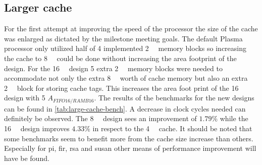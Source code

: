 \documentclass[final]{article}
\begin{document}
\subsection{Larger cache}
For the first attempt at improving the speed of the processor the size of the cache was enlarged as dictated by the milestone meeting goals.
The default Plasma processor only utilized half of 4 implemented \SI{2}{\kibi\byte} memory blocks so increasing the cache to \SI{8}{\kibi\byte} could be done without increasing the area footprint of the design.
For the \SI{16}{\kibi\byte} design 5 extra \SI{2}{\kibi\byte} memory blocks were needed to accommodate not only the extra \SI{8}{\kibi\byte} worth of cache memory but also an extra \SI{2}{\kibi\byte} block for storing cache tags.
This increases the area foot print of the \SI{16}{\kibi\byte} design with 5 $A_{FIFO16/RAMB16}$.
The results of the benchmarks for the new designs can be found in \cref{tab:large-cache-bench}.
A decrease in clock cycles needed can definitely be observed.
The \SI{8}{\kibi\byte} design sees an improvement of $1.79\%$ while the \SI{16}{\kibi\byte} design improves $4.33\%$ in respect to the \SI{4}{\kibi\byte} cache.
It should be noted that some benchmarks seem to benefit more from the cache size increase than others.
Especially for pi, fir, rsa and susan other means of performance improvement will have be found.
\end{document}
